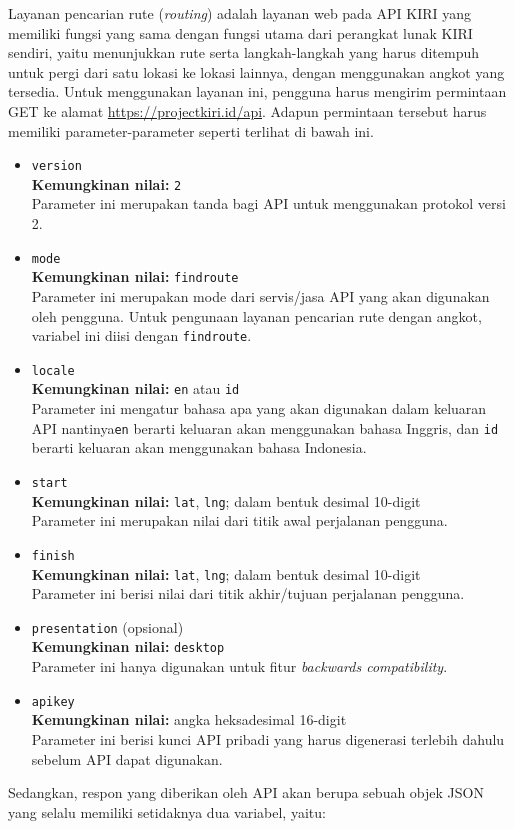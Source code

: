 Layanan pencarian rute (\textit{routing}) adalah layanan web pada API KIRI yang memiliki fungsi yang sama dengan fungsi utama dari perangkat lunak KIRI sendiri, yaitu menunjukkan rute serta langkah-langkah yang harus ditempuh untuk pergi dari satu lokasi ke lokasi lainnya, dengan menggunakan angkot yang tersedia. Untuk menggunakan layanan ini, pengguna harus mengirim permintaan GET ke alamat \href{https://projectkiri.id/api}{https://projectkiri.id/api}. Adapun permintaan tersebut harus memiliki parameter-parameter seperti terlihat di bawah ini.
\begin{itemize}
	\item \verb|version|\\
	\textbf{Kemungkinan nilai:} \verb|2|\\
	Parameter ini merupakan tanda bagi API untuk menggunakan protokol versi 2.
	\item \verb|mode|\\
	\textbf{Kemungkinan nilai:} \verb|findroute|\\
	Parameter ini merupakan mode dari servis/jasa API yang akan digunakan oleh pengguna. Untuk pengunaan layanan pencarian rute dengan angkot, variabel ini diisi dengan \verb|findroute|.
	\item \verb|locale|\\
	\textbf{Kemungkinan nilai:} \verb|en| atau \verb|id|\\
	Parameter ini mengatur bahasa apa yang akan digunakan dalam keluaran API nantinya\textemdash\verb|en| berarti keluaran akan menggunakan bahasa Inggris, dan \verb|id| berarti keluaran akan menggunakan bahasa Indonesia.
	\item \verb|start|\\
	\textbf{Kemungkinan nilai:} \verb|lat|, \verb|lng|; dalam bentuk desimal 10-digit\\
	Parameter ini merupakan nilai \latlon dari titik awal perjalanan pengguna.
	\item \verb|finish|\\
	\textbf{Kemungkinan nilai:} \verb|lat|, \verb|lng|; dalam bentuk desimal 10-digit\\
	Parameter ini berisi nilai \latlon dari titik akhir/tujuan perjalanan pengguna.
	\item \verb|presentation| (opsional)\\
	\textbf{Kemungkinan nilai:} \verb|desktop|\\
	Parameter ini hanya digunakan untuk fitur \textit{backwards compatibility}.
	\item \verb|apikey|\\
	\textbf{Kemungkinan nilai:} angka heksadesimal 16-digit\\
	Parameter ini berisi kunci API pribadi yang harus digenerasi terlebih dahulu sebelum API dapat digunakan.
\end{itemize}
\vspace{\baselineskip}
Sedangkan, respon yang diberikan oleh API akan berupa sebuah objek JSON yang selalu memiliki setidaknya dua variabel, yaitu:

